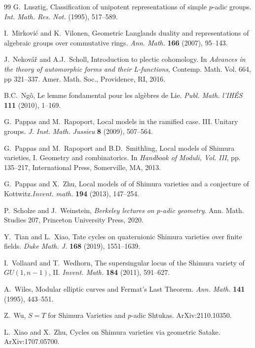 \begin{thebibliography}{99}
G.~Lusztig, Classification of unipotent representations of simple $p$-adic groups. \emph{Int. Math. Res. Not.} (1995), 517--589.

I.~Mirkovi\'c and K.~Vilonen, Geometric Langlands duality and representations of algebraic groups over commutative rings. \emph{Ann. Math.} \textbf{166} (2007), 95--143.

J.~Nekov\'a\v{r} and A.J.~Scholl, Introduction to plectic cohomology. In \emph{Advances in the theory of automorphic forms and their L-functions}, Contemp. Math. Vol. 664, pp 321--337. Amer. Math. Soc., Providence, RI, 2016.

B.C.~Ng\^o, Le lemme fondamental pour les alg\`ebres de Lie. \emph{Publ. Math. l'IH\'ES} \textbf{111} (2010), 1--169.

G.~Pappas and M.~Rapoport, Local models in the ramified case. III. Unitary groups.  \emph{J. Inst. Math. Jussieu} \textbf{8} (2009), 507--564.

G.~Pappas and M.~Rapoport and B.D.~Smithling, Local models of Shimura varieties, I. Geometry and combinatorics. In \emph{Handbook of Moduli, Vol. III}, pp. 135--217, International Press, Somerville, MA, 2013.

G.~Pappas and X.~Zhu, Local models of of Shimura varieties and a conjecture of Kottwitz.\emph{Invent. math.} \textbf{194} (2013), 147--254.

P.~Scholze and J.~Weinstein, \emph{Berkeley lectures on $p$-adic geometry}. Ann. Math. Studies 207, Princeton University Press, 2020.

Y.~Tian and L.~Xiao, Tate cycles on quaternionic Shimura varieties over finite fields. \emph{Duke Math. J.} \textbf{168} (2019), 1551--1639.

I.~Vollaard and T.~Wedhorn, The supersingular locus of the Shimura variety of $GU(1,n-1)$, II. \emph{Invent. Math.} \textbf{184} (2011), 591--627.

A.~Wiles, Modular elliptic curves and Fermat's Last Theorem. \emph{Ann. Math.} \textbf{141} (1995), 443--551.

Z.~Wu, $S=T$ for Shimura Varieties and $p$-adic Shtukas. ArXiv:2110.10350.

L.~Xiao and X.~Zhu, Cycles on Shimura varieties via geometric Satake. ArXiv:1707.05700.


\end{thebibliography}
